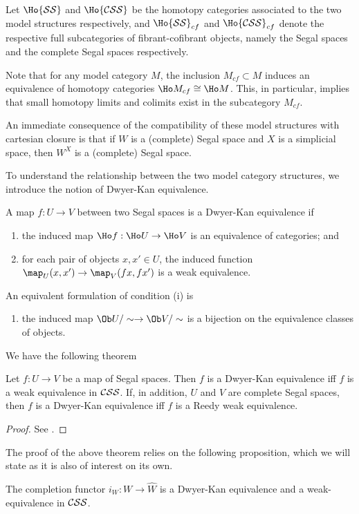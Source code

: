 Let $\Ho{\cal SS}$ and $\Ho{\cal CSS}$ be the homotopy categories associated to the two model structures respectively, and $\Ho{\cal SS}_{cf}$ and $\Ho{\cal CSS}_{cf}$ denote the respective full subcategories of fibrant-cofibrant objects, namely the Segal spaces and the complete Segal spaces respectively.

Note that for any model category $M$, the inclusion $M_{cf}\subset M$ induces an equivalence of homotopy categories $\Ho M_{cf}\cong\Ho M$. This, in particular, implies that small homotopy limits and colimits exist in the subcategory $M_{cf}$.

An immediate consequence of the compatibility of these model structures with cartesian closure is that if $W$ is a (complete) Segal space and $X$ is a simplicial space, then $W^X$ is a (complete) Segal space.

To understand the relationship between the two model category structures, we introduce the notion of Dwyer-Kan equivalence.
\begin{defin}
A map $f:U\to V$ between two Segal spaces is a Dwyer-Kan equivalence if
\begin{enumerate}
\item the induced map $\Ho f:\Ho U\to\Ho V$ is an equivalence of categories; and
\item for each pair of objects $x,x'\in U$, the induced function $\map_U(x,x')\to\map_V(fx,fx')$ is a weak equivalence.
\end{enumerate}
An equivalent formulation of condition (i) is
\begin{enumerate}
\item the induced map $\Ob U/\sim\to\Ob V/\sim$ is a bijection on the equivalence classes of objects.
\end{enumerate}
\end{defin}
We have the following theorem
\begin{thm}
Let $f:U\to V$ be a map of Segal spaces. Then $f$ is a Dwyer-Kan equivalence iff $f$ is a weak equivalence in ${\cal CSS}$. If, in addition, $U$ and $V$ are complete Segal spaces, then $f$ is a Dwyer-Kan equivalence iff $f$ is a Reedy weak equivalence.
\end{thm}
\begin{proof}
See \cite[Thm 7.7]{rezk}.
\end{proof}

The proof of the above theorem relies on the following proposition, which we will state as it is also of interest on its own.
\begin{prop}\label{iw}
The completion functor $i_W:W\to\hat W$ is a Dwyer-Kan equivalence and a weak-equivalence in ${\cal CSS}$.
\end{prop}


